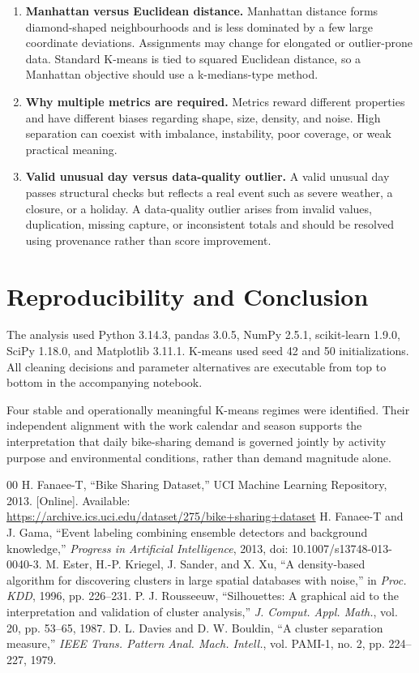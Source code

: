 \documentclass[conference]{IEEEtran}
\begin{document}
\begin{enumerate}
\item \textbf{Manhattan versus Euclidean distance.} Manhattan distance forms diamond-shaped neighbourhoods and is less dominated by a few large coordinate deviations. Assignments may change for elongated or outlier-prone data. Standard K-means is tied to squared Euclidean distance, so a Manhattan objective should use a k-medians-type method.

\item \textbf{Why multiple metrics are required.} Metrics reward different properties and have different biases regarding shape, size, density, and noise. High separation can coexist with imbalance, instability, poor coverage, or weak practical meaning.

\item \textbf{Valid unusual day versus data-quality outlier.} A valid unusual day passes structural checks but reflects a real event such as severe weather, a closure, or a holiday. A data-quality outlier arises from invalid values, duplication, missing capture, or inconsistent totals and should be resolved using provenance rather than score improvement.
\end{enumerate}

\section{Reproducibility and Conclusion}
The analysis used Python 3.14.3, pandas 3.0.5, NumPy 2.5.1, scikit-learn 1.9.0, SciPy 1.18.0, and Matplotlib 3.11.1. K-means used seed 42 and 50 initializations. All cleaning decisions and parameter alternatives are executable from top to bottom in the accompanying notebook.

Four stable and operationally meaningful K-means regimes were identified. Their independent alignment with the work calendar and season supports the interpretation that daily bike-sharing demand is governed jointly by activity purpose and environmental conditions, rather than demand magnitude alone.

\begin{thebibliography}{00}
 H. Fanaee-T, ``Bike Sharing Dataset,'' UCI Machine Learning Repository, 2013. [Online]. Available: \url{https://archive.ics.uci.edu/dataset/275/bike+sharing+dataset}
 H. Fanaee-T and J. Gama, ``Event labeling combining ensemble detectors and background knowledge,'' \emph{Progress in Artificial Intelligence}, 2013, doi: 10.1007/s13748-013-0040-3.
 M. Ester, H.-P. Kriegel, J. Sander, and X. Xu, ``A density-based algorithm for discovering clusters in large spatial databases with noise,'' in \emph{Proc. KDD}, 1996, pp. 226--231.
 P. J. Rousseeuw, ``Silhouettes: A graphical aid to the interpretation and validation of cluster analysis,'' \emph{J. Comput. Appl. Math.}, vol. 20, pp. 53--65, 1987.
 D. L. Davies and D. W. Bouldin, ``A cluster separation measure,'' \emph{IEEE Trans. Pattern Anal. Mach. Intell.}, vol. PAMI-1, no. 2, pp. 224--227, 1979.
\end{thebibliography}
\end{document}
